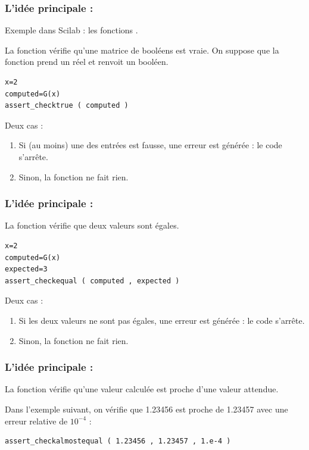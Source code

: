 \documentclass{beamer}
\begin{document}
\begin{frame}[containsverbatim]
\frametitle{L'idée principale : }

Exemple dans Scilab : les fonctions .

La fonction  vérifie qu'une matrice de booléens 
est vraie. 
On suppose que la fonction  prend un réel et renvoit un booléen.

\begin{lstlisting}
x=2
computed=G(x)
assert_checktrue ( computed )
\end{lstlisting}

Deux cas :
\begin{enumerate}
\item Si (au moins) une des entrées est fausse, une erreur est générée : 
le code s'arrête.
\item Sinon, la fonction ne fait rien.
\end{enumerate}

\end{frame}

\begin{frame}[containsverbatim]
\frametitle{L'idée principale : }

La fonction  vérifie que deux valeurs sont égales. 
\begin{lstlisting}
x=2
computed=G(x)
expected=3
assert_checkequal ( computed , expected )
\end{lstlisting}

Deux cas :
\begin{enumerate}
\item Si les deux valeurs ne sont pas égales, une erreur est générée : 
le code s'arrête.
\item Sinon, la fonction ne fait rien.
\end{enumerate}

\end{frame}

\begin{frame}[containsverbatim]
\frametitle{L'idée principale : }

La fonction  vérifie qu'une 
valeur calculée est proche d'une valeur attendue. 

Dans l'exemple suivant, on vérifie que 1.23456 est proche de 
1.23457 avec une erreur relative de $10^{-4}$ :
\begin{lstlisting}
assert_checkalmostequal ( 1.23456 , 1.23457 , 1.e-4 )
\end{lstlisting}

\end{frame}
\end{document}
